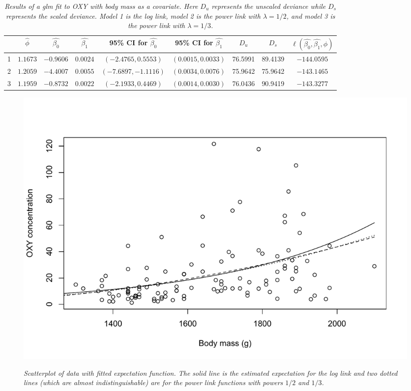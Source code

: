 \documentclass[12pt]{article}
\begin{document}
\begin{enumerate}
    \begin{table}[h]
      \caption{\emph{Results of a glm fit to OXY with body mass as a covariate. Here $D_{u}$ represents the unscaled deviance while $D_{s}$ represents the
      scaled deviance. Model 1 is the log link, model 2 is the power link with $\lambda = 1/2$, and model 3 is the power link with $\lambda = 1/3$.}}
      \vspace{.5cm}
      \centering
      \begin{tabular}{l|c|c|c|c|c|c|c|c}
        \hline
        & $\hat{\phi}$ & $\hat{\beta_0}$ & $\hat{\beta_{1}}$ & 95\% CI for $\hat{\beta_0}$ & 95\% CI for $\hat{\beta_1}$ & $D_{u}$ & $D_{s}$ &
        $\ell(\hat{\beta_0}, \hat{\beta_1}, \hat{\phi})$ \\
        \hline
        1 & $1.1673$ & $-0.9606$ & $0.0024$ & $(-2.4765, 0.5553)$ & $(0.0015, 0.0033)$ & 76.5991 & 89.4139 & $-144.0595$ \\
        \hline
        2 & $1.2059$ & $-4.4007$ & $0.0055$ & $(-7.6897, -1.1116)$ & $(0.0034, 0.0076)$ & 75.9642 & 75.9642 & $-143.1465$ \\
        \hline
        3 & $1.1959$ & $-0.8732$ & $0.0022$ & $(-2.1933, 0.4469)$ & $(0.0014, 0.0030)$ & 76.0436 & 90.9419 & $-143.3277$ \\
        \hline
      \end{tabular}
      \label{tab:1}
    \end{table}


    \vspace{5cm}


    \begin{figure}[h]
      \caption{\emph{Scatterplot of data with fitted expectation function. The solid line is the
          estimated expectation for the log link and two dotted lines (which are almost indistinguishable) are for the power link functions with powers $1/2$
    and $1/3$.}}
      \centering
      \includegraphics[width=.8\textwidth]{./figures/hw03_fitted.pdf}
      \label{fig:5}
    \end{figure}
\end{enumerate}
\end{document}
